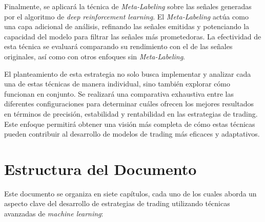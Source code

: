 \documentclass[a4paper,12pt, twoside]{report}
\begin{document}
Finalmente, se aplicará la técnica de \textit{Meta-Labeling} sobre las señales generadas 
por el algoritmo de \textit{deep reinforcement learning}. El \textit{Meta-Labeling} actúa 
como una capa adicional de análisis, refinando las señales emitidas y potenciando la capacidad 
del modelo para filtrar las señales más prometedoras. La efectividad de esta técnica se evaluará 
comparando su rendimiento con el de las señales originales, así como con otros enfoques sin 
\textit{Meta-Labeling}.

El planteamiento de esta estrategia no solo busca implementar y analizar cada una de estas 
técnicas de manera individual, sino también explorar cómo funcionan en conjunto. Se realizará 
una comparativa exhaustiva entre las diferentes configuraciones para determinar cuáles ofrecen 
los mejores resultados en términos de precisión, estabilidad y rentabilidad en las estrategias 
de trading. Este enfoque permitirá obtener una visión más completa de cómo estas técnicas 
pueden contribuir al desarrollo de modelos de trading más eficaces y adaptativos.





\section{Estructura del Documento}

Este documento se organiza en siete capítulos, cada uno de los cuales aborda un aspecto clave del desarrollo de estrategias de trading utilizando técnicas avanzadas de \textit{machine learning}:
\end{document}
